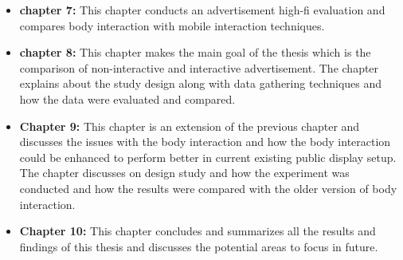 \begin{itemize}
\item \textbf{chapter 7:}
This chapter conducts an advertisement high-fi evaluation and compares body interaction with mobile interaction techniques.


\item \textbf{chapter 8:}
This chapter makes the main goal of the thesis which is the comparison of non-interactive and interactive advertisement. The chapter explains about the study design along with data gathering techniques and how the data were evaluated and compared.


\item \textbf{Chapter 9:}
This chapter is an extension of the previous chapter and discusses the issues with the body interaction and how the body interaction could be enhanced to perform better in current existing public display setup. The chapter discusses on design study and how the experiment was conducted and how the results were compared with the older version of body interaction. 


\item \textbf{Chapter 10:}
This chapter concludes and summarizes all the results and findings of this thesis and discusses the potential areas to focus in future. 

\end{itemize}

